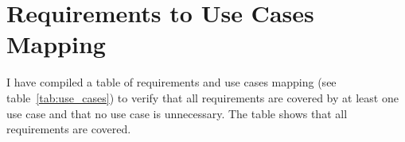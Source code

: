 

\section{Requirements to Use Cases Mapping}
I have compiled a table of requirements and use cases mapping (see table~\ref{tab:use_cases}) to verify that all requirements are covered by at least one use case and that no use case is unnecessary.
The table shows that all requirements are covered.

